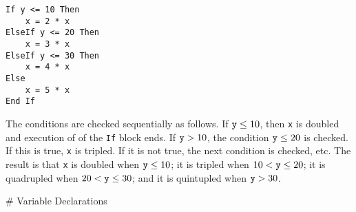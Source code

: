 \small\begin{verbatim}
If y <= 10 Then
    x = 2 * x
ElseIf y <= 20 Then
    x = 3 * x
ElseIf y <= 30 Then
    x = 4 * x
Else
    x = 5 * x
End If
\end{verbatim}\normalsize
\noindent The conditions are checked sequentially as follows.  If $\verb!y!\leq 10$, then \verb!x! is doubled and execution of of the \verb!If! block ends.  If $\verb!y! > 10$, the condition $\verb!y! \leq 20$ is checked.  If this is true, \verb!x! is tripled.  If it is not true, the next condition is checked, etc.  The result is that \verb!x! is doubled when $\verb!y!\leq 10$; it is tripled when $10<\verb!y!\leq 20$; it is quadrupled when  $20<\verb!y!\leq 30$; and it is quintupled when $\verb!y!>30$.

# Variable Declarations

